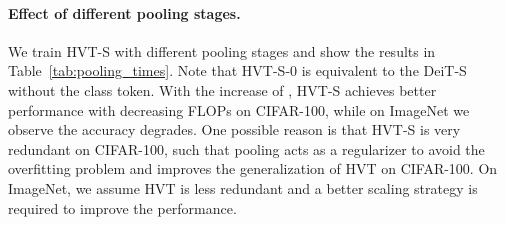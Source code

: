 \begin{table}[]
\caption{Performance comparisons on HVT-S with different pooling stages . We report the Top-1 and Top-5 accuracy on CIFAR-100.
}
\vspace{-10pt}
\renewcommand\arraystretch{1.1}
\label{tab:pooling_times}
\vspace{-10pt}
\end{table}

\paragraph{Effect of different pooling stages.}
We train HVT-S with different pooling stages  and show the results in Table~\ref{tab:pooling_times}. Note that HVT-S-0 is equivalent to the DeiT-S without the class token.
With the increase of , HVT-S achieves better performance with decreasing FLOPs on CIFAR-100, while on ImageNet we observe the accuracy degrades.
One possible reason is that HVT-S is very redundant on CIFAR-100, such that pooling acts as a regularizer to avoid the overfitting problem and improves the generalization of HVT on CIFAR-100. On ImageNet, we assume HVT is less redundant and a better scaling strategy is required to improve the performance.



